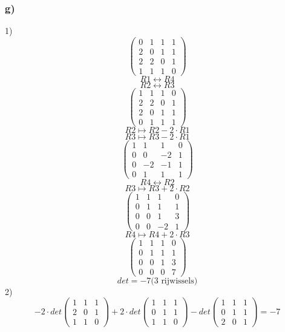 \documentclass[lineaire_algebra_oplossingen.tex]{subfiles}
\begin{document}
\subsubsection*{g)}
1)
\[
\begin{pmatrix}
0 & 1 & 1 & 1\\
2 & 0 & 1 & 1\\
2 & 2 & 0 & 1\\
1 & 1 & 1 & 0
\end{pmatrix}
\]
\[R1 \leftrightarrow R4\]
\[R2 \leftrightarrow R3\]
\[
\begin{pmatrix}
1 & 1 & 1 & 0\\
2 & 2 & 0 & 1\\
2 & 0 & 1 & 1\\
0 & 1 & 1 & 1
\end{pmatrix}
\]
\[R2 \longmapsto R2- 2 \cdot R1 \]
\[R3 \longmapsto R3- 2 \cdot R1 \]
\[
\begin{pmatrix}
1 & 1 & 1 & 0\\
0 & 0 & -2 & 1\\
0 & -2 & -1 & 1\\
0 & 1 & 1 & 1
\end{pmatrix}
\]
\[R4 \leftrightarrow R2\]
\[R3 \longmapsto R3 + 2 \cdot R2\]
\[
\begin{pmatrix}
1 & 1 & 1 & 0\\
0 & 1 & 1 & 1\\
0 & 0 & 1 & 3\\
0 & 0 & -2 & 1
\end{pmatrix}
\]
\[R4 \longmapsto R4 + 2 \cdot R3\]
\[
\begin{pmatrix}
1 & 1 & 1 & 0\\
0 & 1 & 1 & 1\\
0 & 0 & 1 & 3\\
0 & 0 & 0 & 7
\end{pmatrix}
\]
\[det = -7 \text{(3 rijwissels)} \]
2)
\[ -2 \cdot det
\begin{pmatrix}
1 & 1 & 1\\
2 & 0 & 1\\
1 & 1 & 0
\end{pmatrix}
+2 \cdot det
\begin{pmatrix}
1 & 1 & 1\\
0 & 1 & 1\\
1 & 1 & 0
\end{pmatrix}
- det 
\begin{pmatrix}
1 & 1 & 1\\
0 & 1 & 1\\
2 & 0 & 1
\end{pmatrix}
=-7
\]
\end{document}
